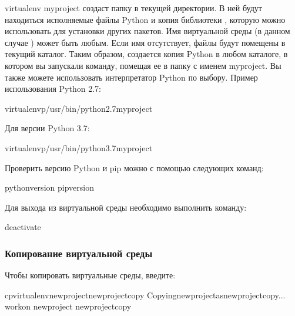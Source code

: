 \documentclass[letterpaper,10pt,russian]{sphinxmanual}
\begin{document}
\sphinxAtStartPar
virtualenv myproject создаст папку в текущей директории. В ней будут находиться исполняемые файлы Python и копия библиотеки , которую можно использовать для установки других пакетов. Имя виртуальной среды (в данном случае ) может быть любым. Если имя отсутствует, файлы будут помещены в текущий каталог. Таким образом, создается копия Python в любом каталоге, в котором вы запускали команду, помещая ее в папку с именем myproject.
Вы также можете использовать интерпретатор Python по выбору. Пример использования Python 2.7:

\begin{sphinxVerbatim}[commandchars=\\\{\}]
\PYGZdl{}virtualenv\PYGZhy{}p/usr/bin/python2.7myproject
\end{sphinxVerbatim}

\sphinxAtStartPar
Для версии Python 3.7:

\begin{sphinxVerbatim}[commandchars=\\\{\}]
\PYGZdl{}virtualenv\PYGZhy{}p/usr/bin/python3.7myproject
\end{sphinxVerbatim}

\sphinxAtStartPar
Проверить версию Python и pip можно с помощью следующих команд:

\begin{sphinxVerbatim}[commandchars=\\\{\}]
\PYGZdl{}python\PYGZhy{}\PYGZhy{}version
\PYGZdl{}pip\PYGZhy{}\PYGZhy{}version
\end{sphinxVerbatim}

\sphinxAtStartPar
Для выхода из виртуальной среды необходимо выполнить команду:

\begin{sphinxVerbatim}[commandchars=\\\{\}]
\PYGZdl{}deactivate
\end{sphinxVerbatim}


\subsubsection{Копирование виртуальной среды}
\label{\detokenize{educational_materials/path_venv/content:id6}}
\sphinxAtStartPar
Чтобы копировать виртуальные среды, введите:

\begin{sphinxVerbatim}[commandchars=\\\{\}]
\PYGZdl{}cpvirtualenvnew\PYGZhy{}projectnew\PYGZhy{}project\PYGZhy{}copy
Copyingnew\PYGZhy{}projectasnew\PYGZhy{}project\PYGZhy{}copy...
\PYGZdl{}workon
new\PYGZhy{}project
new\PYGZhy{}project\PYGZhy{}copy
\end{sphinxVerbatim}
\end{document}
